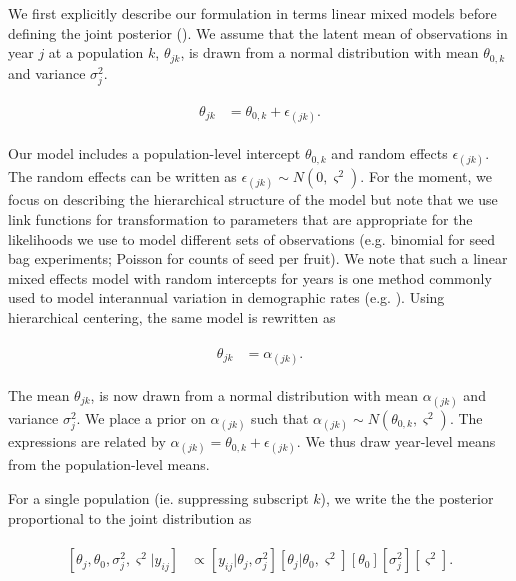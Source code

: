 \documentclass[12pt, oneside, titlepage]{article}   	%
\begin{document}
{We first explicitly describe our formulation in terms linear mixed models before defining the joint posterior (\cite{evans2010,ogle2020}). We assume that the latent mean of observations in year $j$ at a population $k$, $\theta_{jk}$, is drawn from a normal distribution with mean $\theta_{0,k}$ and variance $\sigma^2_j$.

\begin{align}
  \begin{split}
  \theta_{jk} &  = \theta_{0,k} +\epsilon_{(jk)}.
  \end{split}
\end{align}

Our model includes a population-level intercept $\theta_{0,k}$ and random effects $\epsilon_{(jk)}$. The random effects can be written as  $\epsilon_{(jk)}\sim N(0, \varsigma^2)$. For the moment, we focus on describing the hierarchical structure of the model but note that we use link functions for transformation to parameters that are appropriate for the likelihoods we use to model different sets of observations (e.g. binomial for seed bag experiments; Poisson for counts of seed per fruit). We note that such a linear mixed effects model with random intercepts for years is one method commonly used to model interannual variation in demographic rates (e.g. \cite{metcalf2015}). Using hierarchical centering, the same model is rewritten as 

\begin{align}
  \begin{split}
  \theta_{jk} &  = \alpha_{(jk)}.
  \end{split}
\end{align}

The mean $\theta_{jk}$, is now drawn from a normal distribution with mean $\alpha_{(jk)}$ and variance $\sigma^2_j$. We place a prior on $\alpha_{(jk)}$ such that $\alpha_{(jk)}\sim N(\theta_{0,k}, \varsigma^2)$. The expressions are related by $\alpha_{(jk)}=\theta_{0,k}+\epsilon_{(jk)}$. We thus draw year-level means from the population-level means. 

For a single population (ie. suppressing subscript $k$), we write the the posterior proportional to the joint distribution as

\begin{align}
  \begin{split}
  [ \theta_j , \theta_0 , \sigma_j^2 , \varsigma^2 | y_{ij} ] &  \propto [ y_{ij} | \theta_j , \sigma^2_j] [ \theta_j | \theta_0 , \varsigma^2 ] [ \theta_0 ] [ \sigma^2_j] [ \varsigma^2].
  \end{split}
\end{align}

}
\end{document}
